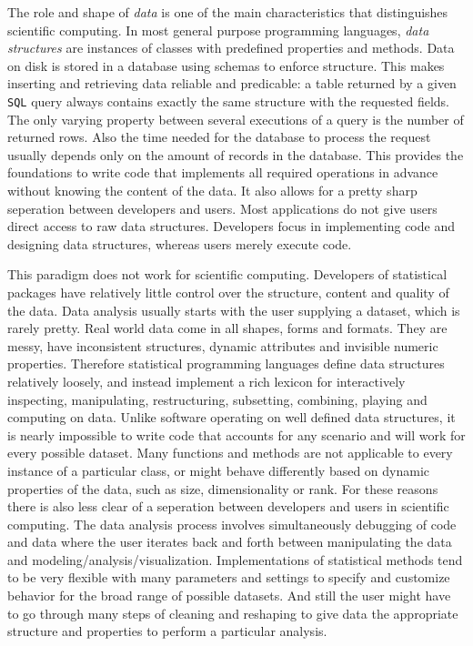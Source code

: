 \documentclass{article}
\newcommand{\SQL}{\texttt{SQL}\xspace}
\begin{document}
The role and shape of \emph{data} is one of the main characteristics that distinguishes scientific computing. In most general purpose programming languages, \emph{data structures} are instances of classes with predefined properties and methods. Data on disk is stored in a database using schemas to enforce structure. This makes inserting and retrieving data reliable and predicable: a table returned by a given \SQL query always contains exactly the same structure with the requested fields. The only varying property between several executions of a query is the number of returned rows. Also the time needed for the database to process the request usually depends only on the amount of records in the database. This provides the foundations to write code that implements all required operations in advance without knowing the content of the data. It also allows for a pretty sharp seperation between developers and users. Most applications do not give users direct access to raw data structures. Developers focus in implementing code and designing data structures, whereas users merely execute code.

This paradigm does not work for scientific computing. Developers of statistical packages have relatively little control over the structure, content and quality of the data. Data analysis usually starts with the user supplying a dataset, which is rarely pretty. Real world data come in all shapes, forms and formats. They are messy, have inconsistent structures, dynamic attributes and invisible numeric properties. Therefore statistical programming languages define data structures relatively loosely, and instead implement a rich lexicon for interactively inspecting, manipulating, restructuring, subsetting, combining, playing and computing on data. Unlike software operating on well defined data structures, it is nearly impossible to write code that accounts for any scenario and will work for every possible dataset. Many functions and methods are not applicable to every instance of a particular class, or might behave differently based on dynamic properties of the data, such as size, dimensionality or rank. For these reasons there is also less clear of a seperation between developers and users in scientific computing. The data analysis process involves simultaneously debugging of code and data where the user iterates back and forth between manipulating the data and modeling/analysis/visualization. Implementations of statistical methods tend to be very flexible with many parameters and settings to specify and customize behavior for the broad range of possible datasets. And still the user might have to go through many steps of cleaning and reshaping to give data the appropriate structure and properties to perform a particular analysis. 
\end{document}
